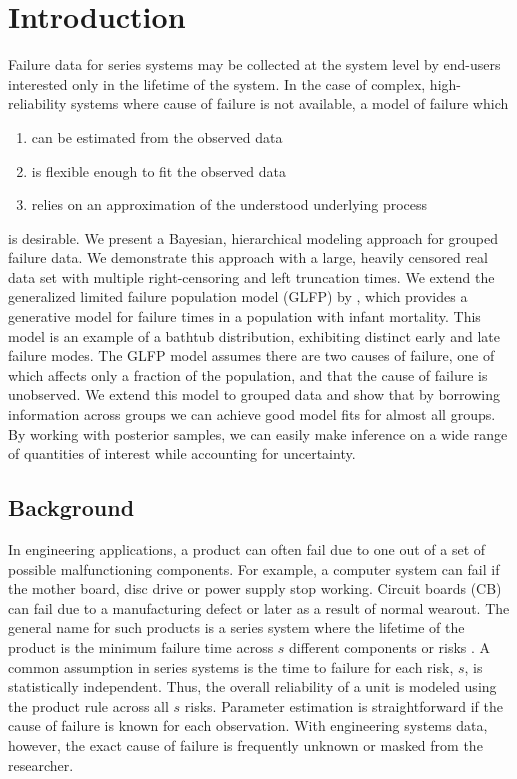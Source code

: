 \documentclass[12pt]{article}
\begin{document}
\section{Introduction}
Failure data for series systems may be collected at the system level by end-users interested only in the lifetime of the system. In the case of complex, high-reliability systems where cause of failure is not available, a model of failure which
\begin{enumerate}[a]
\item can be estimated from the observed data
\item is flexible enough to fit the observed data
\item relies on an approximation of the understood underlying process
\end{enumerate}
is desirable. We present a Bayesian, hierarchical modeling approach for grouped failure data. We demonstrate this approach with a large, heavily censored real data set with multiple right-censoring and left truncation times. We extend the generalized limited failure population model (GLFP) by \citet{chan}, which provides a generative model for failure times in a population with infant mortality. This model is an example of a bathtub distribution, exhibiting distinct early and late failure modes. The GLFP model assumes there are two causes of failure, one of which affects only a fraction of the population, and that the cause of failure is unobserved. We extend this model to grouped data and show that by borrowing information across groups we can achieve good model fits for almost all groups. By working with posterior samples, we can easily make inference on a wide range of quantities of interest while accounting for uncertainty.

\subsection{Background}
In engineering applications, a product can often fail due to one out of a set of possible malfunctioning components.  For example, a computer system can fail if the mother board, disc drive or power supply stop working.  Circuit boards (CB) can fail due to a manufacturing defect or later as a result of normal wearout.  The general name for such products is a series system where the lifetime of the product is the minimum failure time across $s$ different components or risks \citet{nelson}.  A common assumption in series systems is the time to failure for each risk, $s$, is statistically independent.  Thus, the overall reliability of a unit is modeled using the product rule across all $s$ risks.  Parameter estimation is straightforward if the cause of failure is known for each observation.  With engineering systems data, however, the exact cause of failure is frequently unknown or masked from the researcher.  \\
\end{document}
